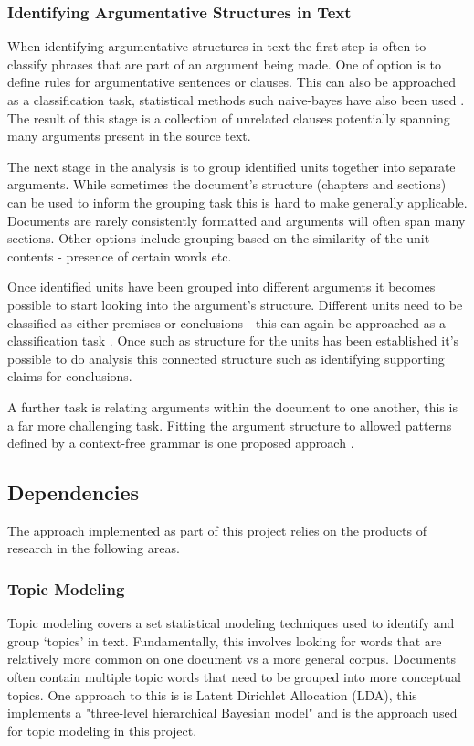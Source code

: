       \subsubsection{Identifying Argumentative Structures in Text}
        When identifying argumentative structures in text the first step is often to classify phrases that are part of an argument being made. One of option is to define rules for argumentative sentences or clauses. This can also be approached as a classification task, statistical methods such naive-bayes have also been used \cite{palau2009argumentation}. The result of this stage is a collection of unrelated clauses potentially spanning many arguments present in the source text.

        The next stage in the analysis is to group identified units together into separate arguments. While sometimes the document's structure (chapters and sections) can be used to inform the grouping task this is hard to make generally applicable. Documents are rarely consistently formatted and arguments will often span many sections. Other options include grouping based on the similarity of the unit contents - presence of certain words etc. \cite{palau2009argumentation}

        Once identified units have been grouped into different arguments it becomes possible to start looking into the argument's structure. Different units need to be classified as either premises or conclusions - this can again be approached as a classification task \cite{palau2009argumentation}. Once such as structure for the units has been established it's possible to do analysis this connected structure such as identifying supporting claims for conclusions.

        A further task is relating arguments within the document to one another, this is a far more challenging task. Fitting the argument structure to allowed patterns defined by a context-free grammar is one proposed approach \cite{palau2009argumentation}.

    \subsection{Dependencies}
      The approach implemented as part of this project relies on the products of research in the following areas.
      \subsubsection{Topic Modeling}
        Topic modeling covers a set statistical modeling techniques used to identify and group `topics' in text. Fundamentally, this involves looking for words that are relatively more common on one document vs a more general corpus. Documents often contain multiple topic words that need to be grouped into more conceptual topics. One approach to this is is Latent Dirichlet Allocation (LDA), this implements a "three-level hierarchical Bayesian model" \cite{blei2003latent} and is the approach used for topic modeling in this project.
